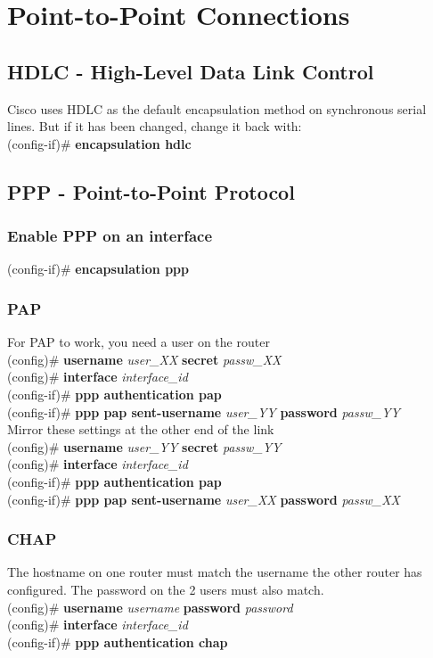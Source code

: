 \section{Point-to-Point Connections}
\subsection{HDLC - High-Level Data Link Control}
\textrm{Cisco uses HDLC as the default encapsulation method on synchronous serial lines. But if it has been changed, change it back with:}\vspace{4pt}\\
(config-if)\# \textbf{encapsulation hdlc}

\subsection{PPP - Point-to-Point Protocol}
\subsubsection*{Enable PPP on an interface}
(config-if)\# \textbf{encapsulation ppp}
\subsubsection*{PAP}
\textrm{For PAP to work, you need a user on the router}\vspace{4pt}\\
(config)\# \textbf{username} \textit{user\_XX} \textbf{secret} \textit{passw\_XX}\\
(config)\# \textbf{interface} \textit{interface\_id}\\
(config-if)\#\textbf{ ppp authentication pap}\\
(config-if)\# \textbf{ppp pap sent-username} \textit{user\_YY} \textbf{password} \textit{passw\_YY}\vspace{11pt}\\
\textrm{Mirror these settings at the other end of the link}\vspace{4pt}\\
(config)\# \textbf{username} \textit{user\_YY} \textbf{secret} \textit{passw\_YY}\\
(config)\# \textbf{interface} \textit{interface\_id}\\
(config-if)\# \textbf{ppp authentication pap}\\
(config-if)\# \textbf{ppp pap sent-username} \textit{user\_XX} \textbf{password} \textit{passw\_XX}
\subsubsection*{CHAP}
\textrm{The hostname on one router must match the username the other router has configured. The password on the 2 users must also match.}\vspace{4pt}\\
(config)\# \textbf{username} \textit{username} \textbf{password} \textit{password}\\
(config)\# \textbf{interface} \textit{interface\_id}\\
(config-if)\# \textbf{ppp authentication chap}

